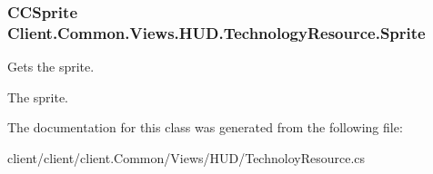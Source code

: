 \subsubsection[{Sprite}]{\setlength{\rightskip}{0pt plus 5cm}C\+C\+Sprite Client.\+Common.\+Views.\+H\+U\+D.\+Technology\+Resource.\+Sprite\hspace{0.3cm}{\ttfamily [get]}}\label{classClient_1_1Common_1_1Views_1_1HUD_1_1TechnologyResource_a8d4f66dd350c06badddce45977b55049}


Gets the sprite. 

The sprite.

The documentation for this class was generated from the following file\+:\begin{DoxyCompactItemize}
\item 
client/client/client.\+Common/\+Views/\+H\+U\+D/Technoloy\+Resource.\+cs\end{DoxyCompactItemize}
